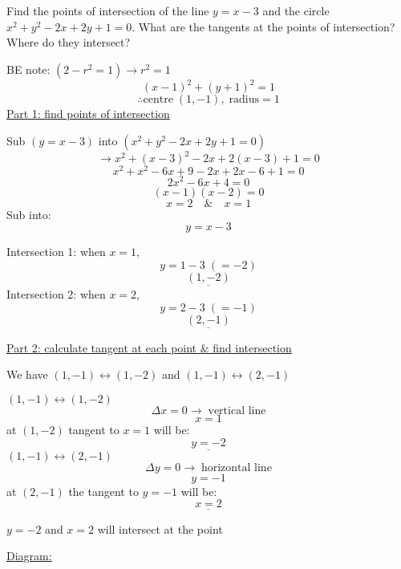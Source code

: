 \hlquestion Find the points of intersection of the line 
$y = x - 3$ 
and the circle 
$x^{2} + y^{2} - 2x + 2y + 1 = 0$.
What are the tangents at the points of intersection? 
Where do they intersect?

\begin{solution}
	BE note: $(2 - r^{2} = 1) \rightarrow r^{2} = 1$
	\[
		(x-1)^{2} + (y+1)^{2} = 1
	\]
	\[
		\therefore
		\text{centre} \; 
		(1, -1)
		,\; \text{radius} = 
		1
	\]
	\underline{Part 1: find points of intersection}
	\par
	Sub $(y = x - 3)$ into $(x^{2} + y^{2} - 2x + 2y + 1 = 0)$
	\[
		\rightarrow
		x^{2} + (x-3)^{2} - 2x + 2(x-3) + 1 = 0
	\]
	\[
		x^{2} + x^{2} - 6x + 9 - 2x + 2x - 6 + 1 = 0
	\]
	\[
		2x^{2} - 6x + 4 = 0
	\]
	\[
		(x-1)(x-2) = 0
	\]
	\[
		x = 2 
		\quad \& \quad
		x = 1
	\]
	Sub into: 
	\[
		y = x - 3	
	\]
	\begin{multicols}{2}
		Intersection 1: when $x=1$,
		\[
			y = 1 - 3 
			\; 
			(= -2)
		\]
		\[
			\underline{
				(1, -2)
				}
		\]
		Intersection 2: when $x=2$,
		\[
			y = 2 - 3
			\; 
			(= -1)
		\]
		\[
			\underline{
				(2, -1)
			}
		\]		
	\end{multicols}
	\underline{Part 2: calculate tangent at each point \& find intersection}
	\par
	We have 
	$(1, -1) \leftrightarrow (1, -2)$ 
	and 
	$(1, -1) \leftrightarrow (2, -1)$ 
	\begin{multicols}{2}
		$(1, -1) \leftrightarrow (1, -2)$ 
		\[
			\Delta x = 0 \rightarrow 
			\; 
			\text{vertical line}
		\]
		\[
				x = 1
		\]
		at $(1,-2)$ tangent to $x=1$ will be:
		\[
			\underline{
				y = -2
			}	
		\]
		$(1, -1) \leftrightarrow (2, -1)$
		\[
			\Delta y = 0 \rightarrow 
			\; 
			\text{horizontal line}
		\]
		\[
			y = -1
		\]
		at $(2,-1)$ the tangent to $y=-1$ will be:
		\[
			\underline{
				x = 2
			}
		\]
	\end{multicols}
	$y = -2$ and $x = 2$ will intersect at the point
	\par

	\underline{Diagram:}
	\begin{center}
\end{center}
\end{solution}
